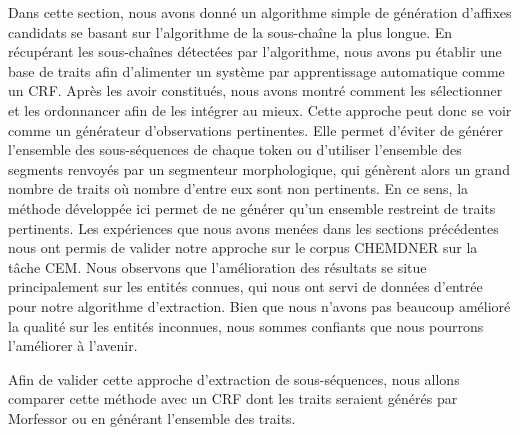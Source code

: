 \documentclass[PhD-Yoann-Dupont.tex]{subfiles}
\begin{document}
Dans cette section, nous avons donné un algorithme simple de génération d'affixes candidats se basant sur l'algorithme de la sous-chaîne la plus longue. En récupérant les sous-chaînes détectées par l'algorithme, nous avons pu établir une base de traits afin d'alimenter un système par apprentissage automatique comme un CRF. Après les avoir constitués, nous avons montré comment les sélectionner et les ordonnancer afin de les intégrer au mieux. Cette approche peut donc se voir comme un générateur d'observations pertinentes. Elle permet d'éviter de générer l'ensemble des sous-séquences de chaque token ou d'utiliser l'ensemble des segments renvoyés par un segmenteur morphologique, qui génèrent alors un grand nombre de traits où nombre d'entre eux sont non pertinents. En ce sens, la méthode développée ici permet de ne générer qu'un ensemble restreint de traits pertinents. Les expériences que nous avons menées dans les sections précédentes nous ont permis de valider notre approche sur le corpus CHEMDNER sur la tâche CEM. Nous observons que l'amélioration des résultats se situe principalement sur les entités connues, qui nous ont servi de données d'entrée pour notre algorithme d'extraction. Bien que nous n'avons pas beaucoup amélioré la qualité sur les entités inconnues, nous sommes confiants que nous pourrons l'améliorer à l'avenir.

Afin de valider cette approche d'extraction de sous-séquences, nous allons comparer cette méthode avec un CRF dont les traits seraient générés par Morfessor ou en générant l'ensemble des traits.
\end{document}
